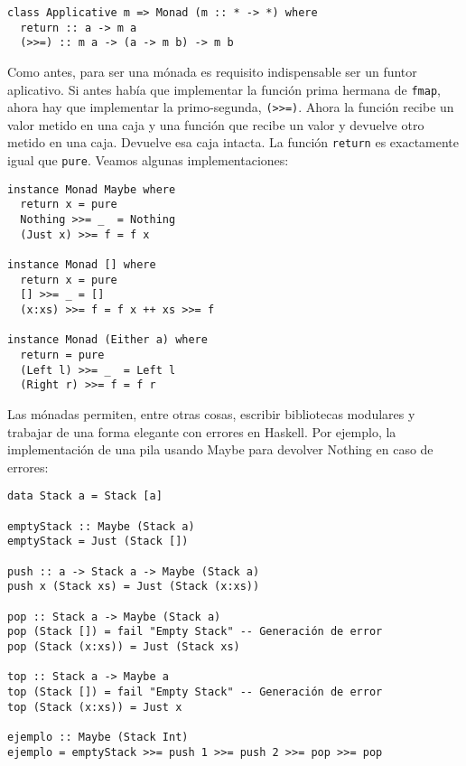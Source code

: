 \documentclass[class=article, crop=false]{standalone}
\begin{document}
\begin{verbatim}
class Applicative m => Monad (m :: * -> *) where
  return :: a -> m a
  (>>=) :: m a -> (a -> m b) -> m b
\end{verbatim}

Como antes, para ser una mónada es requisito indispensable ser un funtor aplicativo. Si antes
había que implementar la función prima hermana de \verb`fmap`, ahora hay que implementar la
primo-segunda, \verb`(>>=)`. Ahora la función recibe un valor metido en una caja y una
función que recibe un valor y devuelve otro metido en una caja. Devuelve esa caja intacta. La
función \verb`return` es exactamente igual que \verb`pure`. Veamos algunas implementaciones:

\begin{verbatim}
instance Monad Maybe where
  return x = pure
  Nothing >>= _  = Nothing
  (Just x) >>= f = f x

instance Monad [] where
  return x = pure
  [] >>= _ = []
  (x:xs) >>= f = f x ++ xs >>= f

instance Monad (Either a) where
  return = pure
  (Left l) >>= _  = Left l
  (Right r) >>= f = f r
\end{verbatim}

Las mónadas permiten, entre otras cosas, escribir bibliotecas modulares y trabajar de una
forma elegante con errores en Haskell. Por ejemplo, la implementación de una pila usando
Maybe para devolver Nothing en caso de errores:

\begin{verbatim}
data Stack a = Stack [a]

emptyStack :: Maybe (Stack a)
emptyStack = Just (Stack [])

push :: a -> Stack a -> Maybe (Stack a)
push x (Stack xs) = Just (Stack (x:xs))

pop :: Stack a -> Maybe (Stack a)
pop (Stack []) = fail "Empty Stack" -- Generación de error
pop (Stack (x:xs)) = Just (Stack xs)

top :: Stack a -> Maybe a
top (Stack []) = fail "Empty Stack" -- Generación de error
top (Stack (x:xs)) = Just x

ejemplo :: Maybe (Stack Int)
ejemplo = emptyStack >>= push 1 >>= push 2 >>= pop >>= pop
\end{verbatim}
\end{document}
